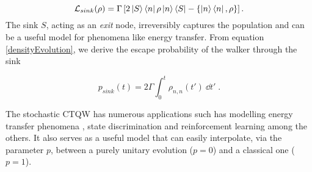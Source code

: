 \documentclass[../../main.tex]{subfiles}
\begin{document}

\begin{equation}
    \mathcal{L}_{sink} (\rho) = \Gamma \left [ 2\ket{S}\bra{n}\rho \ket{n} \bra{S} - \{\ket{n}\bra{n}, \rho\} \right ].
\end{equation}
The sink \(S\), acting as an \emph{exit} node, irreversibly captures the
population and can be a useful model for phenomena like energy transfer. From
equation \eqref{densityEvolution}, we derive the escape probability of the walker
through the sink



\begin{equation}
    p_{sink}(t) = 2 \Gamma \int_0^t \rho_{n,n}(t') \ \dd t' \; .
\end{equation}


The stochastic CTQW has numerous applications such has modelling energy
transfer phenomena \cite{Caruso2009}, state discrimination \cite{Pozza2020} and
reinforcement learning \cite{Pozza2022,Buffoni2020} among the others. It also
serves as a useful model that can easily interpolate, via the parameter $p$,
between a purely unitary evolution ($p=0$) and a classical one ($p=1$).


\end{document}
